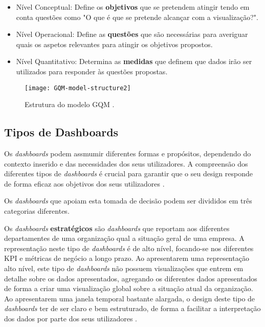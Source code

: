 \begin{itemize}
  \item Nível Conceptual: Define os \textbf{objetivos} que se pretendem atingir tendo em conta questões como "O que é que se pretende alcançar com a visualização?".
  \item Nível Operacional: Define as \textbf{questões} que são necessárias para averiguar quais os aspetos relevantes para atingir os objetivos propostos. 
  \item Nível Quantitativo: Determina as \textbf{medidas} que definem que dados irão ser utilizados para responder às questões propostas.
\end{itemize}

\begin{figure}[htbp]
  \centering
  \texttt{[image: GQM-model-structure2]}
  \caption{Estrutura do modelo \gls{GQM} \cite{article}.}
  \label{fig:gqm-model}
\end{figure}

\subsection{Tipos de Dashboards} %
\label{sub:tipos_dashboards}

Os \textit{dashboards} podem assmumir diferentes formas e propósitos, dependendo do contexto inserido e das necessidades dos seus utilizadores. A compreensão dos diferentes tipos de \textit{dashboards} é crucial para garantir que o seu design responde de forma eficaz aos objetivos dos seus utilizadores \cite{eckerson2010performance}.

Os \textit{dashboards} que apoiam esta tomada de decisão podem ser divididos em três categorias diferentes.

Os \textit{dashboards} \textbf{estratégicos} são \textit{dashboards} que reportam aos diferentes departamentes de uma organização qual a situação geral de uma empresa. A representação neste tipo de \textit{dashboards} é de alto nível, focando-se nos diferentes \gls{KPI} e métricas de negócio a longo prazo. Ao apresentarem uma representação alto nível, este tipo de \textit{dashboards} não possuem visualizações que entrem em detalhe sobre os dados apresentados, agregando os diferentes dados apresentados de forma a criar uma visualização global sobre a situação atual da organização. Ao apresentarem uma janela temporal bastante alargada, o design deste tipo de \textit{dashboards} ter de ser claro e bem estruturado, de forma a facilitar a interpretação dos dados por parte dos seus utilizadores \cite{pappas2011riding}. 

